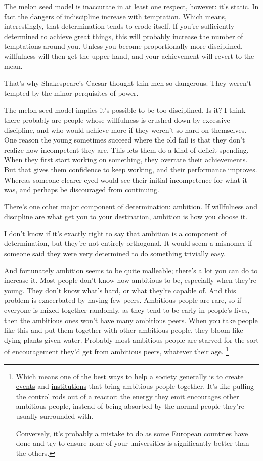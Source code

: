 The melon seed model is inaccurate in at least one respect, however:
it's static. In fact the dangers of indiscipline increase with
temptation. Which means, interestingly, that determination tends to
erode itself. If you're sufficiently determined to achieve great things,
this will probably increase the number of temptations around you. Unless
you become proportionally more disciplined, willfulness will then get
the upper hand, and your achievement will revert to the mean.

That's why Shakespeare's Caesar thought thin men so dangerous. They
weren't tempted by the minor perquisites of power.

The melon seed model implies it's possible to be too disciplined. Is it?
I think there probably are people whose willfulness is crushed down by
excessive discipline, and who would achieve more if they weren't so hard
on themselves. One reason the young sometimes succeed where the old fail
is that they don't realize how incompetent they are. This lets them do a
kind of deficit spending. When they first start working on something,
they overrate their achievements. But that gives them confidence to keep
working, and their performance improves. Whereas someone clearer-eyed
would see their initial incompetence for what it was, and perhaps be
discouraged from continuing.

There's one other major component of determination: ambition. If
willfulness and discipline are what get you to your destination,
ambition is how you choose it.

I don't know if it's exactly right to say that ambition is a component
of determination, but they're not entirely orthogonal. It would seem a
misnomer if someone said they were very determined to do something
trivially easy.

And fortunately ambition seems to be quite malleable; there's a lot you
can do to increase it. Most people don't know how ambitious to be,
especially when they're young. They don't know what's hard, or what
they're capable of. And this problem is exacerbated by having few peers.
Ambitious people are rare, so if everyone is mixed together randomly, as
they tend to be early in people's lives, then the ambitious ones won't
have many ambitious peers. When you take people like this and put them
together with other ambitious people, they bloom like dying plants given
water. Probably most ambitious people are starved for the sort of
encouragement they'd get from ambitious peers, whatever their age.
\footnote{Which means one of the best ways to help a society generally is
to create \href{http://startupschool.org}{events} and
\href{http://ycombinator.com}{institutions} that bring ambitious people
together. It's like pulling the control rods out of a reactor: the
energy they emit encourages other ambitious people, instead of being
absorbed by the normal people they're usually surrounded with.

Conversely, it's probably a mistake to do as some European countries
have done and try to ensure none of your universities is significantly
better than the others.}


